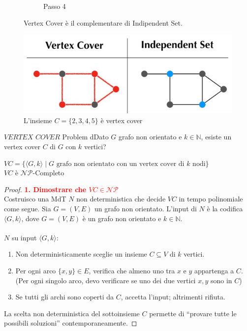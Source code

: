 \documentclass{article}  %
\theoremstyle{definition}
\begin{document}
\begin{figure}[h]
\begin{subfigure}[b]{0.24\textwidth}
		\caption{Passo 4}
	\end{subfigure}
	\caption{L'insieme $C=\{2,3,4,5\}$ è vertex cover}
	\begin{osservazioni}[Osservazioni]
		Vertex Cover è il complementare di Indipendent Set.
		\begin{center}
			\includegraphics[width=0.5\linewidth]{vc-indset.png}
		\end{center}
	\end{osservazioni}
\end{figure}
\begin{theorem}{$VERTEX$ $COVER$ Problem}
	dDato $G$ grafo non orientato e $k \in \mathbb{N}$, esiste un vertex cover $C$ di $G$ con $k$ vertici?
	\begin{center}
		$VC = \{\langle G,k \rangle \mid G \text{ grafo non orientato con un vertex cover di } k \text{ nodi}\}$ \\
		$VC$ è $\mathcal{NP}$-Completo
	\end{center}
	\footnotesize
	\begin{proof}
		\textcolor{red}{\textbf{1. Dimostrare che $VC \in \mathcal{NP}$}} \\
		Costruisco una MdT $N$ non deterministica che decide $VC$ in tempo polinomiale come segue. Sia $G=(V,E)$ un grafo non orientato.
		L'input di \( N \) è la codifica \( \langle G, k \rangle \), dove \( G = (V, E) \) è un grafo non orientato e \( k \in \mathbb{N} \). \\ \\
		$N$ su input $\langle G, k \rangle$:
		\begin{enumerate}
			\item Non deterministicamente sceglie un insieme $C \subseteq V$ di $k$ vertici.
			\item Per ogni arco $\{x,y\} \in E$, verifica che almeno uno tra $x$ e $y$ appartenga a $C$. \\
			      (Per ogni singolo arco, devo verificare se uno dei due vertici $x,y$ sono in $C$)
			\item Se tutti gli archi sono coperti da $C$, accetta l'input; altrimenti rifiuta.
		\end{enumerate}
		La scelta non deterministica del sottoinsieme $C$ permette di “provare tutte le possibili soluzioni” contemporaneamente.

\end{proof}
\end{theorem}
\end{document}
